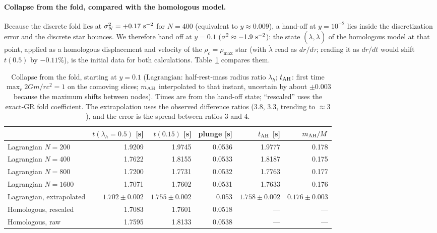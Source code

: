 \documentclass[11pt]{article}
\begin{document}
\paragraph{Collapse from the fold, compared with the homologous model.} Because the discrete fold lies at $\sigma^2_N=+0.17\ {\rm s^{-2}}$ for $N=400$ (equivalent to $y\approx0.009$), a hand-off at $y=10^{-2}$ lies inside the discretization error and the discrete star bounces. We therefore hand off at $y=0.1$ ($\sigma^2\approx-1.9\ {\rm s^{-2}}$): the state $(\lambda,\dot\lambda)$ of the homologous model at that point, applied as a homologous displacement and velocity of the $\rho_c=\rho_{\max}$ star (with $\dot\lambda$ read as $dr/d\tau$; reading it as $dr/dt$ would shift $t(0.5)$ by $-0.11\%$), is the initial data for both calculations. Table~\ref{tab:lag} compares them.
\begin{table}[ht]
\centering\footnotesize\setlength{\tabcolsep}{4pt}
\begin{tabular}{lrrrrr}
\hline
 & $t(\lambda_h=0.5)$ [s] & $t(0.15)$ [s] & plunge [s] & $t_{\rm AH}$ [s] & $m_{\rm AH}/M$\\
\hline
Lagrangian $N=200$ & 1.9209 & 1.9745 & 0.0536 & 1.9777 & 0.178\\
Lagrangian $N=400$ & 1.7622 & 1.8155 & 0.0533 & 1.8187 & 0.175\\
Lagrangian $N=800$ & 1.7200 & 1.7731 & 0.0532 & 1.7763 & 0.177\\
Lagrangian $N=1600$ & 1.7071 & 1.7602 & 0.0531 & 1.7633 & 0.176\\
Lagrangian, extrapolated & $1.702\pm0.002$ & $1.755\pm0.002$ & 0.053 & $1.758\pm0.002$ & $0.176\pm0.003$\\
Homologous, rescaled & 1.7083 & 1.7601 & 0.0518 & --- & ---\\
Homologous, raw & 1.7595 & 1.8133 & 0.0538 & --- & ---\\
\hline
\end{tabular}
\caption{Collapse from the fold, starting at $y=0.1$ (Lagrangian: half-rest-mass radius ratio $\lambda_h$; $t_{\rm AH}$: first time $\max_r2Gm/rc^2=1$ on the comoving slices; $m_{\rm AH}$ interpolated to that instant, uncertain by about $\pm0.003$ because the maximum shifts between nodes). Times are from the hand-off state; ``rescaled'' uses the exact-GR fold coefficient. The extrapolation uses the observed difference ratios ($3.8$, $3.3$, trending to $\approx3$), and the error is the spread between ratios $3$ and $4$.}
\label{tab:lag}
\end{table}
\end{document}

